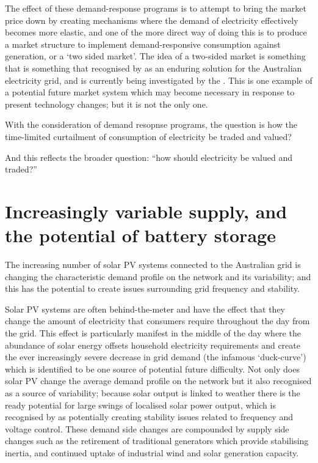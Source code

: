 The effect of these demand-response programs is to attempt to bring the market price down by creating mechanisms where the demand of electricity effectively becomes more elastic, and one of the more direct way of doing this is to produce a market structure to implement demand-responsive consumption against generation, or a `two sided market'.
The idea of a two-sided market is something that is something that recognised by \cite{australianenergymarketcommission2020} as an enduring solution for the Australian electricity grid, and is currently being investigated by the \cite{energysecurityboard2020}.
This is one example of a potential future market system which may become necessary in response to present technology changes; but it is not the only one.

With the consideration of demand resopnse programs, the question is how the time-limited curtailment of consumption of electricity be traded and valued?

\noindent And this reflects the broader question: ``how should electricity be valued and traded?'' 

\section{Increasingly variable supply, and the potential of battery storage}

The increasing number of solar PV systems connected to the Australian grid is changing the characteristic demand profile on the network and its variability; and this has the potential to create issues surrounding grid frequency and stability.

Solar PV systems are often behind-the-meter and have the effect that they change the amount of electricity that consumers require throughout the day from the grid.
This effect is particularly manifest in the middle of the day where the abundance of solar energy offsets household electricity requirements and create the ever increasingly severe decrease in grid demand (the infamous `duck-curve') which is identified to be one source of potential future difficulty.
Not only does solar PV change the average demand profile on the network but it also recognised as a source of variability; because solar output is linked to weather there is the ready potential for large swings of localised solar power output, which is recognised by \cite{australianenergymarketoperatorlimited2018} as potentially creating stability issues related to frequency and voltage control.
These demand side changes are compounded by supply side changes such as the retirement of traditional generators which provide stabilising inertia, and continued uptake of industrial wind and solar generation capacity.

